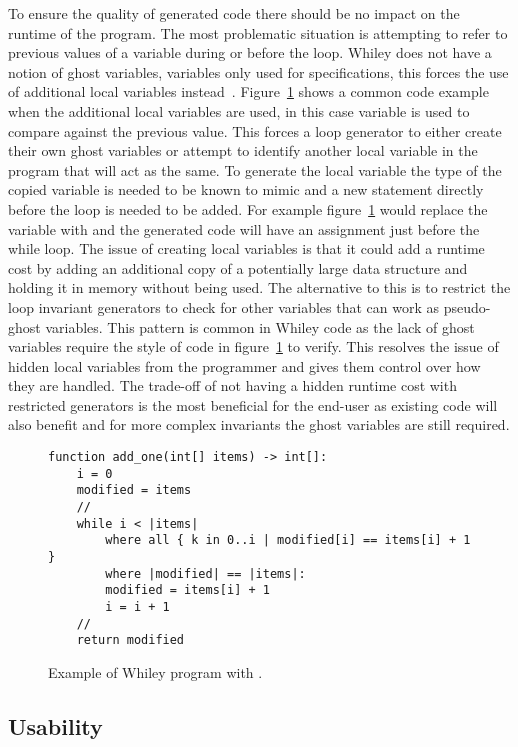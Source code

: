 To ensure the quality of generated code there should be no impact on the
runtime of the program.
The most problematic situation is attempting to refer to previous values of
a variable during or before the loop.
Whiley does not have a notion of ghost variables, variables only used for
specifications, this forces the use of additional local variables instead~\cite{whiley-origin}.
Figure~\ref{lst:vars} shows a common code example when the additional local
variables are used, in this case  variable is used to compare
against the previous value.
This forces a loop generator to either create their own ghost variables or
attempt to identify another local variable in the program that will act as the
same.
To generate the local variable the type of the copied variable is needed to be
known to mimic and a new statement directly before the loop is needed to be
added.
For example figure~\ref{lst:vars} would replace the  variable
with  and the generated code will have an assignment just before
the while loop.
The issue of creating local variables is that it could add a runtime cost by
adding an additional copy of a potentially large data structure
and holding it in memory without being used.
The alternative to this is to restrict the loop invariant generators to check
for other variables that can work as pseudo-ghost variables.
This pattern is common in Whiley code as the lack of ghost variables require
the style of code in figure~\ref{lst:vars} to verify.
This resolves the issue of hidden local variables from the programmer
and gives them control over how they are handled.
The trade-off of not having a hidden runtime cost with restricted generators
is the most beneficial for the end-user as existing code will also benefit
and for more complex invariants the ghost variables are still required.

\begin{figure}[ht]
\begin{lstlisting}
function add_one(int[] items) -> int[]:
    i = 0
    modified = items
    //
    while i < |items|
        where all { k in 0..i | modified[i] == items[i] + 1 }
        where |modified| == |items|:
        modified = items[i] + 1
        i = i + 1
    //
    return modified
\end{lstlisting}
\caption{Example of Whiley program with .}
\label{lst:vars}
\end{figure}

\subsection{Usability}

